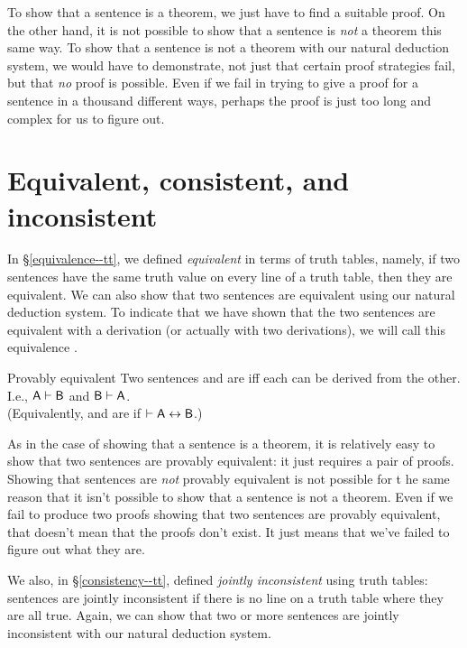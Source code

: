 To show that a sentence is a theorem, we just have to find a suitable proof. On the other hand, it is not possible to show that a sentence is \emph{not} a theorem this same way. To show that a sentence is not a theorem with our natural deduction system, we would have to demonstrate, not just that certain proof strategies fail, but that \emph{no} proof is possible. Even if we fail in trying to give a proof for a sentence in a thousand different ways, perhaps the proof is just too long and complex for us to figure out. 


\section{Equivalent, consistent, and inconsistent}

In \S\ref{equivalence--tt}, we defined \textit{equivalent} in terms of truth tables, namely, if two sentences have the same truth value on every line of a truth table, then they are equivalent. We can also show that two sentences are equivalent using our natural deduction system. To indicate that we have shown that the two sentences are equivalent with a derivation (or actually with two derivations), we will call this equivalence . 

\begin{factboxy}{Provably equivalent}
Two sentences  and  are  iff each can be derived from the other. I.e., $\mathsf{A}\vdash\mathsf{B}$ and $\mathsf{B}\vdash\mathsf{A}$.\\
(Equivalently,  and  are  if $\vdash \mathsf{A} \leftrightarrow \mathsf{B}$.)
\end{factboxy}
        
As in the case of showing that a sentence is a theorem, it is relatively easy to show that two sentences are provably equivalent: it just requires a pair of proofs. Showing that sentences are \emph{not} provably equivalent is not possible for t he same reason that it isn't possible to show that a sentence is not a theorem. Even if we fail to produce two proofs showing that two sentences are provably equivalent, that doesn't mean that the proofs don't exist. It just means that we've failed to figure out what they are. 

We also, in \S\ref{consistency--tt}, defined \textit{jointly inconsistent} using truth tables: sentences are jointly inconsistent if there is no line on a truth table where they are all true. Again, we can show that two or more sentences are jointly inconsistent with our natural deduction system. 

